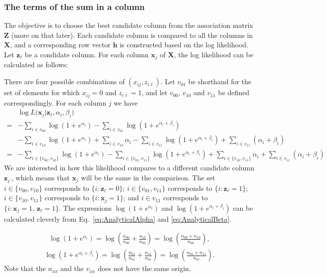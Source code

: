 \documentclass[12pt]{article}
\begin{document}
\subsubsection*{The terms of the sum in a column} \label{sec:TermsCol} %

The objective is to choose the best candidate column from the association matrix $\mathbf{Z}$ (more on that later). 
Each candidate column is compared to all the columns in $\mathbf{X}$, and a corresponding row vector $\mathbf{h}$ is constructed based on the log likelihood. 
Let $\mathbf{z}_\ell$ be a condidate column.
For each column $\mathbf{x}_j$ of $\mathbf{X}$, the log likelihood can be calculated as follows:

There are four possible combinations of $(x_{ij},z_{i\ell})$. Let $v_{01}$ be shorthand for the set of elements for which $x_{ij} = 0$ and $z_{i\ell} = 1$, and let $v_{00}$, $v_{10}$ and $v_{11}$ be defined correspondingly. 
For each column $j$ we have
\begin{align}
 & \log L \big (\mathbf{x}_j|\mathbf{z}_\ell, \alpha_i, \beta_i \big )  \\
  = & -\sum_{i \in v_{00}} \log(1 + e^{\alpha_i}) - \sum_{i \in v_{01}} \log (1 + e^{\alpha_i + \beta_i}) \nonumber \\
&  - \sum_{i \in v_{10}} \log (1 + e^{\alpha_i}) + \sum_{i \in v_{10}} \alpha_i - \sum_{i \in v_{11}} \log (1 + e^{\alpha_i + \beta_i}) + \sum_{i \in v_{11}} (\alpha_i + \beta_i) \nonumber \\
 = &  -\sum_{i \in \{v_{00}, v_{10}\}} \log(1 + e^{\alpha_i}) - \sum_{i \in \{ v_{01}, v_{11}\}} \log (1 + e^{\alpha_i + \beta_i}) +  \sum_{i \in \{ v_{10}, v_{11}\}} \alpha_i + \sum_{i \in v_{11}} (\alpha_i + \beta_i) \nonumber
\end{align}
We are interested in how this likelihood compares to a different candidate column $\mathbf{z}_{\ell^\prime}$, which means that $\mathbf{x}_j$ will be the same in the comparison. 
The set $i \in \{v_{00}, v_{10}\}$ corresponds to $\{i: \mathbf{z}_\ell = 0\}$; $i \in \{ v_{01}, v_{11}\}$ corresponds to $\{i: \mathbf{z}_\ell = 1\}$; $i \in \{ v_{10}, v_{11}\}$ corresponds to $\{i: \mathbf{x}_j = 1\}$; and $i \in v_{11}$ corresponds to $\{ i : \mathbf{x}_j = 1, \, \mathbf{z}_\ell = 1\}$.
The expressions $\log(1 + e^{\alpha_i})$ and $\log (1 + e^{\alpha_i + \beta_i})$ can be calculated cleverly from Eq.~\ref{eq:AnalyticalAlpha} and \ref{eq:AnalyticalBeta}.

\begin{align}
  \log(1 + e^{\alpha_i}) = \log(\frac{n_{00}}{n_{00}} +  \frac{n_{10}}{n_{00}}) = \log(\frac{n_{00}+n_{10}}{n_{00}}),
\end{align}
\begin{align} \label{eq:Log1alphabeta}
  \log(1 + e^{\alpha_i + \beta_i}) = \log(\frac{n_{01}}{n_{01}} +  \frac{n_{11}}{n_{01}}) = \log(\frac{n_{01}+n_{11}}{n_{01}}).
\end{align}
Note that the $n_{xx}$ and the $v_{xx}$ does not have the same origin.
\end{document}

